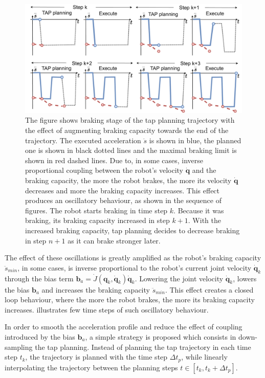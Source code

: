 \begin{figure}[!t]
    \centering
    \includegraphics[width=\linewidth]{Papers/imgs/oscilation_expl.pdf}
    \caption{The figure shows braking stage of the \gls{tap} planning trajectory with the effect of augmenting braking capacity towards the end of the trajectory. The executed acceleration $\ddot{s}$ is shown in blue, the planned one is shown in black dotted lines and the maximal braking limit is shown in red dashed lines. Due to, in some cases, inverse proportional coupling between the robot's velocity $\dot{\bm{q}}$ and the braking capacity, the more the robot brakes, the more its velocity $\dot{\bm{q}}$ decreases and more the braking capacity increases. This effect produces an oscillatory behaviour, as shown in the sequence of figures. The robot starts braking in time step $k$. Because it was braking, its braking capacity increased in step $k+1$. With the increased braking capacity, \gls{tap} planning decides to decrease braking in step $n+1$ as it can brake stronger later.}
    \label{fig:overshoot_shema}
\end{figure}
The effect of these oscillations is greatly amplified as the robot's braking capacity $\ddot{s}_{min}$, in some cases, is inverse proportional to the robot's current joint velocity $\dot{\bm{q}}_{k}$ through the bias term $\bm{b}_a = \dot{J}(\bm{q}_k,\dot{\bm{q}}_k)\dot{\bm{q}}_k$. Lowering the joint velocity $\dot{\bm{q}}_{k}$, lowers the bias $\bm{b}_a$ and increases the braking capacity $\ddot{s}_{min}$. This effect creates a closed loop behaviour, where the more the robot brakes, the more its braking capacity increases.  illustrates few time steps of such oscillatory behaviour.

In order to smooth the acceleration profile and reduce the effect of coupling introduced by the bias $\bm{b}_a$, a simple strategy is proposed which consists in down-sampling the \gls{tap} planning. Instead of planning the \gls{tap} trajectory in each time step $t_k$, the trajectory is planned with the time step $\Delta t_p$, while linearly interpolating the trajectory between the planning steps $t \in \left[t_k, t_k+\Delta t_p\right]$. 

